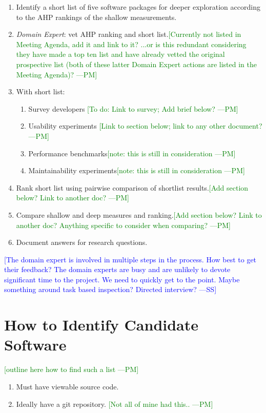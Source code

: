 \documentclass[letterpaper,cleveref]{lipics-v2019}
\newcommand{\authornote}[3]{\textcolor{#1}{[#3 ---#2]}}
\newcommand{\authornote}[3]{}
\newcommand{\wss}[1]{\authornote{blue}{SS}{#1}} %
\newcommand{\pmi}[1]{\authornote{green}{PM}{#1}} %
\theoremstyle{definition}
\begin{document}
\begin{enumerate}
\item Identify a short list of five software packages for deeper exploration according to the AHP rankings of the shallow measurements.
\item \emph{Domain Expert}: vet AHP ranking and short list.\pmi{Currently not listed in Meeting Agenda, add it and link to it? ...or is this redundant considering they have made a top ten list and have already vetted the original prospective list (both of these latter Domain Expert actions are listed in the Meeting Agenda)?}
\item With short list:
\begin{enumerate}
\item Survey developers \pmi{To do: Link to survey; Add brief below?}
\item Usability experiments \pmi{Link to section below; link to any other document?}
\item Performance benchmarks\pmi{note: this is still in consideration}
\item Maintainability experiments\pmi{note: this is still in consideration}
\end{enumerate}
\item Rank short list using pairwise comparison of shortlist results.\pmi{Add section below? Link to another doc?}
\item Compare shallow and deep measures and ranking.\pmi{Add section below? Link to another doc? Anything specific to consider when comparing?}
\item Document answers for research questions.
\end{enumerate}

\wss{The domain expert is involved in multiple steps in the process.  How best
  to get their feedback?  The domain experts are busy and are unlikely to devote
  significant time to the project.  We need to quickly get to the point.  Maybe
  something around task based inspection?  Directed interview?}

\section{How to Identify Candidate Software} \label{SecIdentifyCandSoft}
\pmi{outline here how to find such a list}
\begin{enumerate}
\item Must have viewable source code.
\item Ideally have a git repository. \pmi{Not all of mine had this..}
\end{enumerate}
\end{document}
